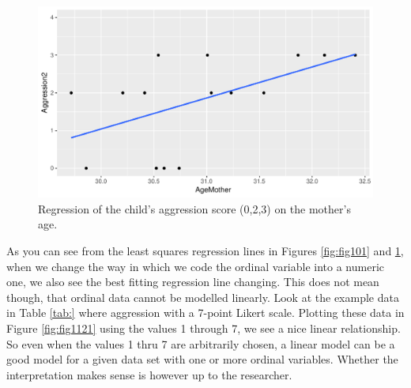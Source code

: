 \documentclass[]{report}\usepackage[]{graphicx}\usepackage[]{color}
\makeatletter
\def\maxwidth{ %
  \ifdim\Gin@nat@width>\linewidth
    \linewidth
  \else
    \Gin@nat@width
  \fi
}
\newenvironment{knitrout}{}{} %
\makeatother
\begin{document}
\begin{knitrout}
\color{fgcolor}\begin{figure}

{\centering \includegraphics[width=\maxwidth]{figure/fig1114-1} 

}

\caption[Regression of the child's aggression score (0,2,3) on the mother's age]{Regression of the child's aggression score (0,2,3) on the mother's age.}\label{fig:fig1114}
\end{figure}


\end{knitrout}

As you can see from the least squares regression lines in Figures \ref{fig:fig101} and \ref{fig:fig1114}, when we change the way in which we code the ordinal variable into a numeric one, we also see the best fitting regression line changing. This does not mean though, that ordinal data cannot be modelled linearly. Look at the example data in Table \ref{tab:} where aggression with a 7-point Likert scale. Plotting these data in Figure \ref{fig:fig1121} using the values 1 through 7, we see a nice linear relationship. So even when the values 1 thru 7 are arbitrarily chosen, a linear model can be a good model for a given data set with one or more ordinal variables. Whether the interpretation makes sense is however up to the researcher. 
\end{document}
